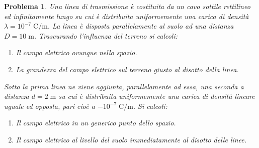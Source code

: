 \documentclass[b5paper,twoside]{book}
\newtheorem{problema}{Problema}
\begin{document}
\begin{problema}
	Una linea di trasmissione è costituita da un cavo sottile
	rettilineo ed infinitamente lungo su cui è distribuita
	uniformemente una carica di densità $\lambda = 10^{-7} \; \mathrm{C/m}$.
	La linea è disposta parallelamente al suolo ad una distanza
	$D = 10 \; \mathrm{m}$.
	Trascurando l'influenza del terreno si calcoli:
	\begin{enumerate}
		\item Il campo elettrico ovunque nello spazio.
		\item La grandezza del campo elettrico sul terreno giusto
		al disotto della linea.
	\end{enumerate}
	Sotto la prima linea ne viene aggiunta, parallelamente ad essa, 
	una seconda a distanza $d = 2 \; \mathrm{m}$ su cui è
	distribuita uniformemente una carica di densità lineare uguale ed opposta, 
	pari cioè a $-10^{-7} \; \mathrm{C/m}$. Si calcoli:
	\begin{enumerate}[start=3]
		\item Il campo elettrico in un generico punto dello spazio.
		\item Il campo elettrico al livello del suolo immediatamente 
		al disotto delle linee.
	\end{enumerate}
\end{problema}
\end{document}
